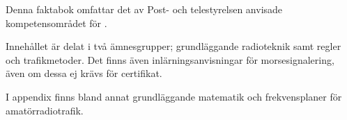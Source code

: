 Denna faktabok omfattar det av Post- och telestyrelsen anvisade
kompetensområdet för .

Innehållet är delat i två ämnesgrupper; grundläggande radioteknik
samt regler och trafikmetoder.
Det finns även inlärningsanvisningar för morsesignalering,
även om dessa ej krävs för certifikat.

I appendix finns bland annat grundläggande matematik
och frekvensplaner för amatörradiotrafik.

